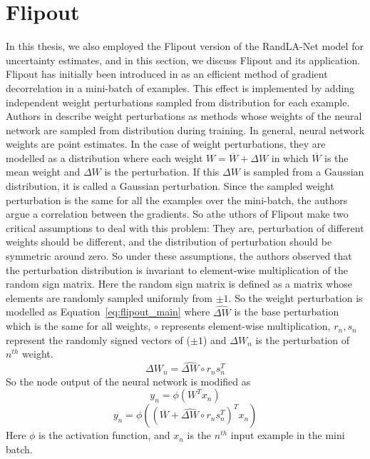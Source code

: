\section{Flipout}
\label{sec:meth_flipout}
In this thesis, we also employed the Flipout version of the RandLA-Net model for uncertainty estimates, and in this section, we discuss Flipout and its application.
Flipout has initially been introduced in \cite{Flipout} as an efficient method of gradient decorrelation in a mini-batch of examples.
This effect is implemented by adding independent weight perturbations sampled from distribution for each example.
Authors in \cite{Flipout} describe weight perturbations as methods whose weights of the neural network are sampled from distribution during training.
In general, neural network weights are point estimates. In the case of weight perturbations, they are modelled as a distribution where each weight $W=\overline{W}+\Delta W$ in which $\overline{W}$ is the mean weight and $\Delta W$ is the perturbation.
If this $\Delta W$ is sampled from a Gaussian distribution, it is called a Gaussian perturbation.
Since the sampled weight perturbation is the same for all the examples over the mini-batch, the authors argue a correlation between the gradients.
So athe uthors of Flipout make two critical assumptions to deal with this problem:
They are, perturbation of different weights should be different, and the distribution of perturbation should be symmetric around zero.
So under these assumptions, the authors observed that the perturbation distribution is invariant to element-wise multiplication of the random sign matrix.
Here the random sign matrix is defined as a matrix whose elements are randomly sampled uniformly from $\pm 1$. 
So the weight perturbation is modelled as Equation~\ref{eq:flipout_main} where $\widehat{\Delta W}$ is the base perturbation which is the same for all weights, $\circ$ represents element-wise multiplication, $r_n, s_n$ represent the randomly signed vectors of ($\pm 1$) and $\Delta W_n$ is the perturbation of $n^{th}$ weight.
\begin{equation}
    \Delta W_n = \widehat{\Delta W} \circ r_n s_{n}^T
    \label{eq:flipout_main}
\end{equation}
So the node output of the neural network is modified as 
$$y_n = \phi(W^T x_n) $$
$$y_n = \phi((\overline{W}+\widehat{\Delta W} \circ r_n s_{n}^T)^Tx_n)$$
Here $\phi$ is the activation function, and $x_n$ is the $n^{th}$ input example in the mini batch.
